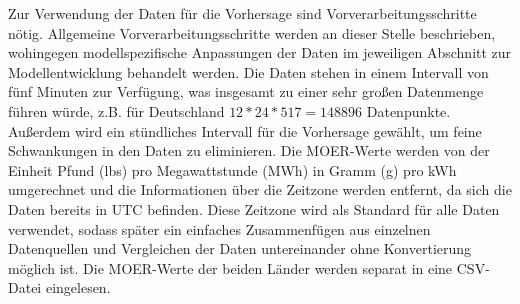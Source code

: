 Zur Verwendung der Daten für die Vorhersage sind Vorverarbeitungsschritte nötig.
Allgemeine Vorverarbeitungsschritte werden an dieser Stelle beschrieben, wohingegen modellspezifische Anpassungen der Daten im jeweiligen Abschnitt zur Modellentwicklung behandelt werden.
Die Daten stehen in einem Intervall von fünf Minuten zur Verfügung, was insgesamt zu einer sehr großen Datenmenge führen würde, z.B. für Deutschland $12 * 24 * 517 = 148 896$ Datenpunkte.
Außerdem wird ein stündliches Intervall für die Vorhersage gewählt, um feine Schwankungen in den Daten zu eliminieren.
Die \ac{MOER}-Werte werden von der Einheit Pfund (lbs) pro Megawattstunde (MWh) in Gramm (g) pro \ac{kWh} umgerechnet und die Informationen über die Zeitzone werden entfernt, da sich die Daten bereits in \ac{UTC} befinden.
Diese Zeitzone wird als Standard für alle Daten verwendet, sodass später ein einfaches Zusammenfügen aus einzelnen Datenquellen und Vergleichen der Daten untereinander ohne Konvertierung möglich ist.
Die \ac{MOER}-Werte der beiden Länder werden separat in eine CSV-Datei eingelesen.

